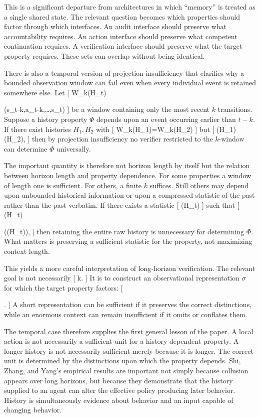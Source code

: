 \documentclass[11pt]{article}
\begin{document}
This is a significant departure from architectures in which ``memory'' is treated as a single shared state. The relevant question becomes which properties should factor through which interfaces. An audit interface should preserve what accountability requires. An action interface should preserve what competent continuation requires. A verification interface should preserve what the target property requires. These sets can overlap without being identical.

There is also a temporal version of projection insufficiency that clarifies why a bounded observation window can fail even when every individual event is retained somewhere else. Let
[
W_k(H_{\leq t})

(s_{t-k},a_{t-k},\ldots,s_t)
]
be a window containing only the most recent $k$ transitions. Suppose a history property $\Phi$ depends upon an event occurring earlier than $t-k$. If there exist histories $H_1,H_2$ with
[
W_k(H_1)=W_k(H_2)
]
but
[
\Phi(H_1)\neq\Phi(H_2),
]
then by projection insufficiency no verifier restricted to the $k$-window can determine $\Phi$ universally.

The important quantity is therefore not horizon length by itself but the relation between horizon length and property dependence. For some properties a window of length one is sufficient. For others, a finite $k$ suffices. Still others may depend upon unbounded historical information or upon a compressed statistic of the past rather than the past verbatim. If there exists a statistic
[
\sigma(H_{\leq t})
]
such that
[
\Phi(H_{\leq t})

\widehat{\Phi}(\sigma(H_{\leq t})),
]
then retaining the entire raw history is unnecessary for determining $\Phi$. What matters is preserving a sufficient statistic for the property, not maximizing context length.

This yields a more careful interpretation of long-horizon verification. The relevant goal is not necessarily
[
k\rightarrow\infty.
]
It is to construct an observational representation $\sigma$ for which the target property factors:
[
\Phi

\widehat{\Phi}\circ\sigma.
]
A short representation can be sufficient if it preserves the correct distinctions, while an enormous context can remain insufficient if it omits or conflates them.

The temporal case therefore supplies the first general lesson of the paper. A local action is not necessarily a sufficient unit for a history-dependent property. A longer history is not necessarily sufficient merely because it is longer. The correct unit is determined by the distinctions upon which the property depends. Shi, Zhang, and Yang's empirical results are important not simply because collusion appears over long horizons, but because they demonstrate that the history supplied to an agent can alter the effective policy producing later behavior. History is simultaneously evidence about behavior and an input capable of changing behavior.
\end{document}
